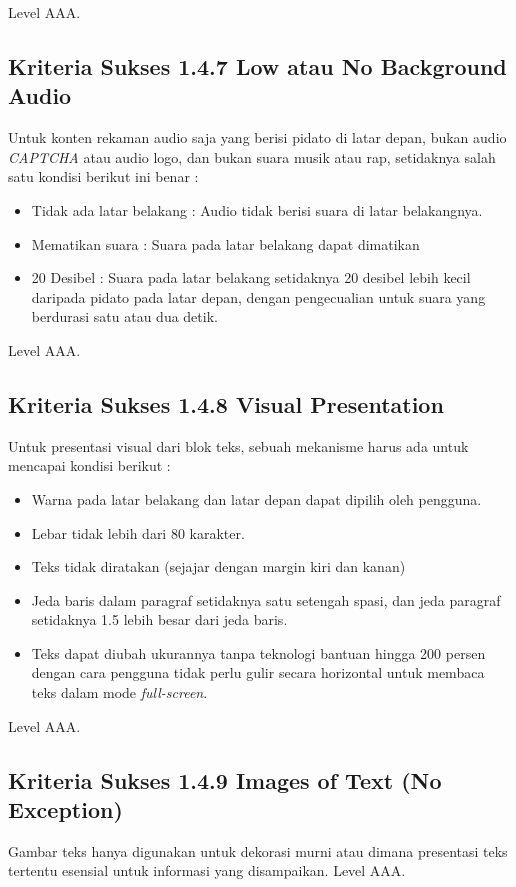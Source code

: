 Level AAA.

\subsection{Kriteria Sukses 1.4.7 Low atau No Background Audio}
\label{sec:kriteria_1.4.7}
Untuk konten rekaman audio saja yang berisi pidato di latar depan, bukan audio \textit{CAPTCHA} atau audio logo, dan bukan suara musik atau rap, setidaknya salah satu kondisi berikut ini benar : 

\begin{itemize}
	\item Tidak ada latar belakang : Audio tidak berisi suara di latar belakangnya.
	\item Mematikan suara : Suara pada latar belakang dapat dimatikan
	\item 20 Desibel : Suara pada latar belakang setidaknya 20 desibel lebih kecil daripada pidato pada latar depan, dengan pengecualian untuk suara yang berdurasi satu atau dua detik.
\end{itemize}
Level AAA.

\subsection{Kriteria Sukses 1.4.8 Visual Presentation}
\label{sec:kriteria_1.4.8}
Untuk presentasi visual dari blok teks, sebuah mekanisme harus ada untuk mencapai kondisi berikut :

\begin{itemize}
	\item Warna pada latar belakang dan latar depan dapat dipilih oleh pengguna.
	\item Lebar tidak lebih dari 80 karakter.
	\item Teks tidak diratakan (sejajar dengan margin kiri dan kanan)
	\item Jeda baris dalam paragraf setidaknya satu setengah spasi, dan jeda paragraf setidaknya 1.5 lebih besar dari jeda baris.
	\item Teks dapat diubah ukurannya tanpa teknologi bantuan hingga 200 persen dengan cara pengguna tidak perlu gulir secara horizontal untuk membaca teks dalam mode \textit{full-screen}.
\end{itemize}

Level AAA.

\subsection{Kriteria Sukses 1.4.9 Images of Text (No Exception)}
\label{sec:kriteria_1.4.9}
Gambar teks hanya digunakan untuk dekorasi murni atau dimana presentasi teks tertentu esensial untuk informasi yang disampaikan. 
Level AAA.

